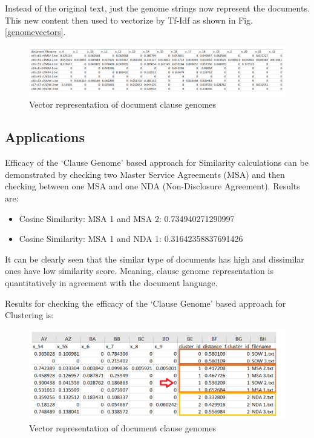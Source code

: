 \documentclass[journal]{journal}
\begin{document}
Instead of the original text, just the genome strings now represent the documents. This new content then used to vectorize by Tf-Idf as shown in Fig. \ref{genomevectors}.

 \begin{figure}[h!]
 \begin{center}
  \includegraphics[width=\linewidth]{img/genomevectors.png}
  \caption{Vector representation of document clause genomes}
  \label{fig:genomevectors}
 \end{center}
 \end{figure}


\subsection{Applications}
\label{subsec:application}

Efficacy of the `Clause Genome' based approach for Similarity calculations can be demonstrated by checking two Master Service Agreements (MSA) and then checking between one MSA and one NDA (Non-Disclosure Agreement). Results are:

 \begin{itemize}
 \item Cosine Similarity: MSA 1 and MSA 2: 0.734940271290997 
\item Cosine Similarity: MSA 1 and NDA 1: 0.31642358837691426 
\end{itemize}

It can be clearly seen that the similar type of documents has high and dissimilar ones have low similarity score. Meaning, clause genome
representation is quantitatively in agreement with the document language.

Results for checking the efficacy of the `Clause Genome' based approach for Clustering is:

 \begin{figure}[h!]
 \begin{center}
  \includegraphics[width=\linewidth]{img/genomeclustering.png}
  \caption{Vector representation of document clause genomes}
  \label{fig:genomeclustering}
 \end{center}
 \end{figure}
 
\end{document}
